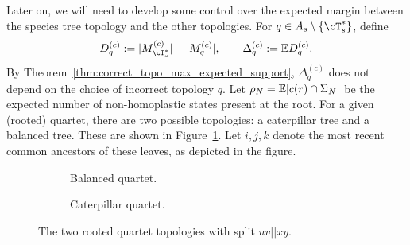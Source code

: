  Later on, we will need to develop some control over the expected margin
 between the species tree topology and the other topologies. For
 $q \in A_s \setminus \{\cT_s^*\}$, define
    \[D_q^{(c)} := |M^{(c)}_{\cT_s^*}| - |M_{q}^{(c)}|,
    \qquad \Delta_q^{(c)} := \E D_q^{(c)}.\]
\noindent By Theorem~\ref{thm:correct_topo_max_expected_support},
$\Delta_q^{(c)}$ does not depend on the choice of incorrect topology $q$.
Let $\rho_N = \mathbb{E} |c(r) \cap \Sigma_N|$ be the
expected number of non-homoplastic states present at the root.
For a given (rooted) quartet, there are two possible topologies: a caterpillar tree and a balanced tree.
These are shown in Figure~\ref{fig:canby_quartet_topologies}.
Let $i,j,k$ denote the most recent common ancestors of these leaves, as depicted in the figure.

\begin{figure}[htbp]
    \centering
    \begin{subfigure}[t]{0.45\textwidth}
        \centering
        \caption{Balanced quartet.}
    \end{subfigure}
    \hfill
    \begin{subfigure}[t]{0.45\textwidth}
        \centering
        \caption{Caterpillar quartet.}
    \end{subfigure}
    \caption{The two rooted quartet topologies with split $uv||xy$. }
    \label{fig:canby_quartet_topologies}
\end{figure}


